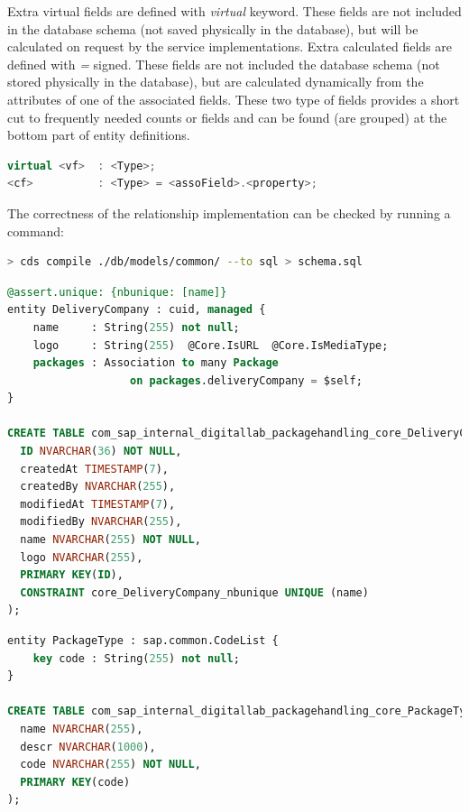 Extra virtual fields are defined with \textit{virtual} keyword. These fields are not included in the database schema (not saved physically in the database), but will be calculated on request by the service implementations. 
Extra calculated fields are defined with \textit{=} signed. These fields are not included the database schema (not stored physically in the database), but are calculated dynamically from the attributes of one of the associated fields.
These two type of fields provides a short cut to frequently needed counts or fields and can be found (are grouped) at the bottom part of entity definitions.

\begin{lstlisting}[language={c++}]
virtual <vf>  : <Type>;
<cf>          : <Type> = <assoField>.<property>;
\end{lstlisting}


The correctness of the relationship implementation can be checked by running a command:

\begin{lstlisting}[language={bash}]
> cds compile ./db/models/common/ --to sql > schema.sql
\end{lstlisting}


\begin{lstlisting}[language={sql}]
@assert.unique: {nbunique: [name]}
entity DeliveryCompany : cuid, managed {
    name     : String(255) not null;
    logo     : String(255)  @Core.IsURL  @Core.IsMediaType;
    packages : Association to many Package
                   on packages.deliveryCompany = $self;
}

CREATE TABLE com_sap_internal_digitallab_packagehandling_core_DeliveryCompany (
  ID NVARCHAR(36) NOT NULL,
  createdAt TIMESTAMP(7),
  createdBy NVARCHAR(255),
  modifiedAt TIMESTAMP(7),
  modifiedBy NVARCHAR(255),
  name NVARCHAR(255) NOT NULL,
  logo NVARCHAR(255),
  PRIMARY KEY(ID),
  CONSTRAINT core_DeliveryCompany_nbunique UNIQUE (name)
); 
\end{lstlisting}

\begin{lstlisting}[language={sql}]
entity PackageType : sap.common.CodeList {
    key code : String(255) not null;
}

CREATE TABLE com_sap_internal_digitallab_packagehandling_core_PackageType (
  name NVARCHAR(255),
  descr NVARCHAR(1000),
  code NVARCHAR(255) NOT NULL,
  PRIMARY KEY(code)
);
\end{lstlisting}

